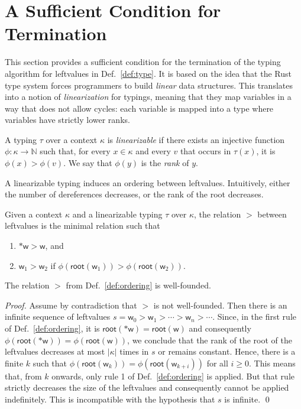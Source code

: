 \section{A Sufficient Condition for Termination}\label{sec:termination}

This section provides a sufficient condition for the termination of the
typing algorithm for leftvalues in Def.~\ref{def:type}. It is based on the
idea that the Rust type system forces programmers to build
\emph{linear} data structures. This translates into a notion of
\emph{linearization} for typings, meaning that they map
variables in a way that does not allow cycles: each variable is mapped
into a type where variables have strictly lower ranks.

\begin{definition}\label{def:linearization}
  A typing $\tau$ over a context $\kappa$ is \emph{linearizable} if there exists
  an injective function $\phi:\kappa\to\mathbb{N}$ such that, for every $x\in\kappa$ and every
  $v$ that occurs in $\tau(x)$, it is $\phi(x)>\phi(v)$. We say that $\phi(y)$ is the \emph{rank} of $y$.
\end{definition}

A linearizable typing induces an ordering between leftvalues. Intuitively, either
the number of dereferences decreases, or the rank of the root decreases.

\begin{definition}\label{def:ordering}
  Given a context $\kappa$ and a linearizable typing $\tau$ over $\kappa$, the
  relation $>$ between leftvalues is the minimal relation such that
  \begin{enumerate}
  \item $\mathtt{*}\mathsf{w}>\mathsf{w}$, and
  \item $\mathsf{w}_1>\mathsf{w}_2$ if $\phi(\mathsf{root}(\mathsf{w}_1))>\phi(\mathsf{root}(\mathsf{w}_2))$.
  \end{enumerate}
\end{definition}

\begin{proposition}\label{prop:well-founded}
  The relation $>$ from Def.~\ref{def:ordering} is well-founded.
\end{proposition}
\begin{proof}
  Assume by contradiction that $>$ is not well-founded. Then there is an infinite sequence of
  leftvalues $s=\mathsf{w}_0>\mathsf{w}_1>\cdots>\mathsf{w}_n>\cdots$.
  Since, in the first rule of Def.~\ref{def:ordering}, it is
  $\mathsf{root}(\mathtt{*}\mathsf{w})=\mathsf{root}(\mathsf{w})$ and consequently
  $\phi(\mathsf{root}(\mathtt{*}\mathsf{w}))=\phi(\mathsf{root}(\mathsf{w}))$,
  we conclude that the rank of the root of the leftvalues
  decreases at most
  $|\kappa|$ times in $s$ or remains constant. Hence, there is a finite $k$ such that
  $\phi(\mathsf{root}(\mathsf{w}_{k}))=\phi(\mathsf{root}(\mathsf{w}_{k+i}))$
  for all $i\ge 0$. This means that, from $k$ onwards, only rule 1 of Def.~\ref{def:ordering}
  is applied. But that rule strictly decreases the size of the leftvalues and consequently cannot
  be applied indefinitely. This is incompatible with the hypothesis that $s$ is infinite.
  \qed
\end{proof}

